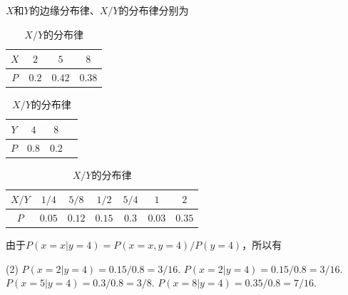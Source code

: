 \begin{solution}$X$和$Y$的边缘分布律、$X/Y$的分布律分别为
    \begin{table}[htbp]
        \begin{minipage}{.24\textwidth}
            \centering
            \begin{tabular}{cccc}
                \toprule
                $X$ & $2$ & $5$ & $8$\\
                \midrule
                $P$ & $0.2$ & $0.42$ & $0.38$\\
                \bottomrule
            \end{tabular}
            \caption*{$X$的边缘分布律}
        \end{minipage}
        \hfill
        \begin{minipage}{.24\textwidth}
            \centering
            \begin{tabular}{cccc}
                \toprule
                $Y$ & $4$ & $8$\\
                \midrule
                $P$ & $0.8$ & $0.2$\\
                \bottomrule
            \end{tabular}
            \caption*{$Y$的边缘分布律}
        \end{minipage}
        \hfill
        \begin{minipage}{.48\textwidth}
            \centering
            \begin{tabular}{ccccccc}
                \toprule
                $X/Y$ & $1/4$ & $5/8$ & $1/2$ & $5/4$ & $1$ & $2$\\
                \midrule
                $P$ & $0.05$ & $0.12$ & $0.15$ & $0.3$ & $0.03$ & $0.35$\\
                \bottomrule
            \end{tabular}
            \caption*{$X/Y$的分布律}
        \end{minipage}
    \end{table}

    由于$P(x=x|y=4)=P(x=x,y=4)/P(y=4)$，所以有
    \begin{tasks}[label=\labelitemi](2)
        \task $P(x=2|y=4)=0.15/0.8=3/16$.
        \task $P(x=2|y=4)=0.15/0.8=3/16$.
        \task $P(x=5|y=4)=0.3/0.8=3/8$.
        \task $P(x=8|y=4)=0.35/0.8=7/16$.
    \end{tasks}
\end{solution}

